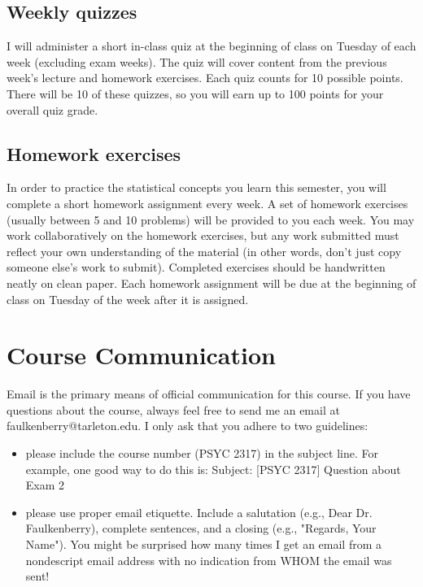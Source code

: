 \documentclass[10pt]{article}
\begin{document}
\subsection*{Weekly quizzes}
\label{sec:orgf03c6fc}
I will administer a short in-class quiz at the beginning of class on Tuesday of each week (excluding exam weeks). The quiz will cover content from the previous week's lecture and homework exercises. Each quiz counts for 10 possible points.  There will be 10 of these quizzes, so you will earn up to 100 points for your overall quiz grade.

\subsection*{Homework exercises}
\label{sec:orga16b765}
In order to practice the statistical concepts you learn this semester, you will complete a short homework assignment every week.  A set of homework exercises (usually between 5 and 10 problems) will be provided to you each week.  You may work collaboratively on the homework exercises, but any work submitted must reflect your own understanding of the material (in other words, don't just copy someone else's work to submit).  Completed exercises should be handwritten neatly on clean paper.  Each homework assignment will be due at the beginning of class on Tuesday of the week after it is assigned.

\section*{Course Communication}
\label{sec:org18dfba8}

Email is the primary means of official communication for this course.  If you have questions about the course, always feel free to send me an email at faulkenberry@tarleton.edu.  I only ask that you adhere to two guidelines:
\begin{itemize}
\item please include the course number (PSYC 2317) in the subject line.  For example, one good way to do this is:  Subject: [PSYC 2317] Question about Exam 2
\item please use proper email etiquette.  Include a salutation (e.g., Dear Dr. Faulkenberry), complete sentences, and a closing (e.g., "Regards, Your Name").  You might be surprised how many times I get an email from a nondescript email address with no indication from WHOM the email was sent!
\end{itemize}
\end{document}
